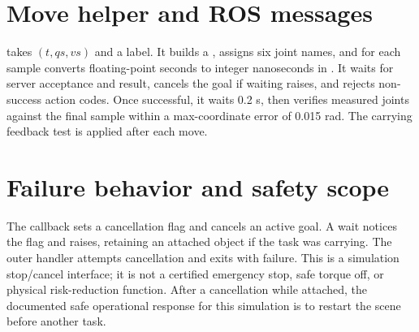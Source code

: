 \section{Move helper and ROS messages}
 takes $(t,qs,vs)$ and a label. It builds a
, assigns six joint names, and for each sample
converts floating-point seconds to integer nanoseconds in
. It waits for server acceptance and result,
cancels the goal if waiting raises, and rejects non-success action codes. Once
successful, it waits 0.2 s, then verifies measured joints against the final
sample within a max-coordinate error of 0.015 rad. The carrying feedback test
is applied after each move.

\section{Failure behavior and safety scope}
The  callback sets a cancellation flag and cancels an active
goal. A wait notices the flag and raises, retaining an attached object if the
task was carrying. The outer handler attempts cancellation and exits with
failure. This is a simulation stop/cancel interface; it is not a certified
emergency stop, safe torque off, or physical risk-reduction function. After a
cancellation while attached, the documented safe operational response for
this simulation is to restart the scene before another task.
